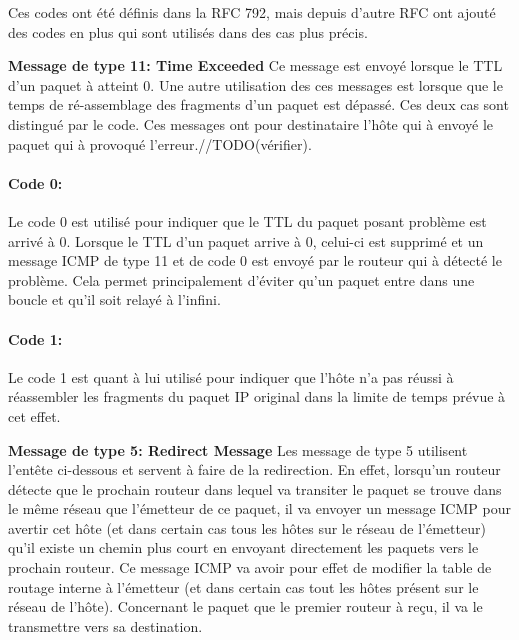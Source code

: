 Ces codes ont été définis dans la RFC 792, mais depuis d'autre RFC ont ajouté
des codes en plus qui sont utilisés dans des cas plus précis.

\vspace{1cm}
\textbf{Message de type 11: Time Exceeded}
Ce message est envoyé lorsque le TTL d'un paquet à atteint 0. Une autre
utilisation des ces messages est lorsque que le temps de ré-assemblage des
fragments d'un paquet est dépassé. Ces deux cas sont distingué par le code. Ces
messages ont pour destinataire l'hôte qui à envoyé le paquet qui à provoqué
l'erreur.//TODO(vérifier).

\paragraph{Code 0:}
Le code 0 est utilisé pour indiquer que le TTL du paquet posant problème est
arrivé à 0.  Lorsque le TTL d'un paquet arrive à 0, celui-ci est supprimé et un
message ICMP de type 11 et de code 0 est envoyé par le routeur qui à détecté le
problème. Cela permet principalement d'éviter qu'un paquet entre dans une
boucle et qu'il soit relayé à l'infini.

\paragraph{Code 1:} Le code 1 est quant à lui utilisé pour indiquer que l'hôte
n'a pas réussi à réassembler les fragments du paquet IP original dans la limite
de temps prévue à cet effet.


\vspace{1cm}
\textbf{Message de type 5: Redirect Message} Les message de type 5 utilisent
l'entête ci-dessous et servent à faire de la redirection. En effet, lorsqu'un
routeur détecte que le prochain routeur dans lequel va transiter le paquet se
trouve dans le même réseau que l'émetteur de ce paquet, il va envoyer un
message ICMP pour avertir cet hôte (et dans certain cas tous les hôtes sur le
réseau de l'émetteur) qu'il existe un chemin plus court en envoyant directement
les paquets vers le prochain routeur. Ce message ICMP va avoir pour effet de
modifier la table de routage interne à l'émetteur (et dans certain cas tout les
hôtes présent sur le réseau de l'hôte). Concernant le paquet que le premier
routeur à reçu, il va le transmettre vers sa destination.



